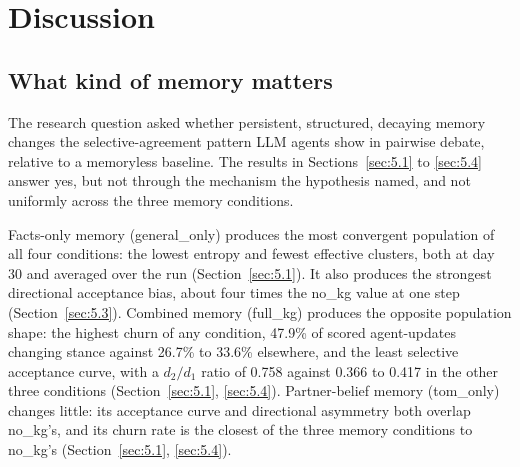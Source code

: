 \documentclass[11pt,a4paper]{article}
\newcommand{\src}[1]{\unskip\marginpar{\raggedright\tiny\textcolor{gray}{#1}}}
\newcommand{\src}[1]{\unskip}
\newcommand{\cond}[1]{\textsf{#1}}
\begin{document}
%

\section{Discussion}\label{sec:6}

\subsection{What kind of memory matters}\label{sec:6.1}

The research question asked whether persistent, structured, decaying memory changes the selective-agreement pattern LLM agents show in pairwise debate, relative to a memoryless baseline\src{hypothesis\_and\_scope.md, "Research question"}. The results in Sections~\ref{sec:5.1} to \ref{sec:5.4} answer yes, but not through the mechanism the hypothesis named, and not uniformly across the three memory conditions.

Facts-only memory (\cond{general\_only}) produces the most convergent population of all four conditions: the lowest entropy and fewest effective clusters, both at day 30 and averaged over the run (Section~\ref{sec:5.1}). It also produces the strongest directional acceptance bias, about four times the \cond{no\_kg} value at one step (Section~\ref{sec:5.3}). Combined memory (\cond{full\_kg}) produces the opposite population shape: the highest churn of any condition, 47.9\% of scored agent-updates changing stance against 26.7\% to 33.6\% elsewhere, and the least selective acceptance curve, with a $d_2/d_1$ ratio of 0.758 against 0.366 to 0.417 in the other three conditions (Section~\ref{sec:5.1}, \ref{sec:5.4}). Partner-belief memory (\cond{tom\_only}) changes little: its acceptance curve and directional asymmetry both overlap \cond{no\_kg}'s, and its churn rate is the closest of the three memory conditions to \cond{no\_kg}'s (Section~\ref{sec:5.1}, \ref{sec:5.4}).
\end{document}
